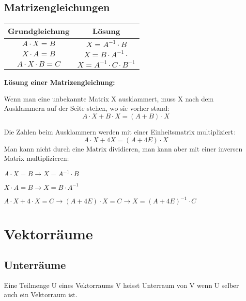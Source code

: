 \begin{multicols*}{3}
    \subsection{Matrizengleichungen}
    { \begin{center}
            \begin{tabular}{ |c|c| }
                \hline
                Grundgleichung        & Lösung                           \\ \hline
                $A \cdot X=B$         & $X = A^{-1}\cdot B$              \\
                $X \cdot A=B$         & $X = B \cdot A^{-1}\cdot $       \\
                $A \cdot X \cdot B=C$ & $X = A^{-1}\cdot C \cdot B^{-1}$ \\
                \hline
            \end{tabular}
        \end{center}}
    {\textbf{Lösung einer Matrizengleichung:} }

    { Wenn man eine unbekannte Matrix X ausklammert, muss X nach
        dem Ausklammern auf der Seite stehen, wo sie vorher stand:}
    $$A \cdot X + B \cdot X =(A + B) \cdot X$$

    {  Die Zahlen beim Ausklammern werden mit einer Einheitsmatrix
            multipliziert:}
    $$A \cdot X + 4 X =( A + 4 E) \cdot X$$
    { Man kann nicht durch eine Matrix dividieren, man kann aber mit
            einer inversen Matrix multiplizieren:}

        { $A\cdot X = B \to X = A^{-1} \cdot B$}

        { $X\cdot A = B \to X = B \cdot A^{-1}$}

        { $A\cdot X + 4 \cdot X = C \to (A+4E) \cdot X = C \to X = (A+4E)^{-1} \cdot C$}






    \vfill\null
    \columnbreak
    \section{Vektorräume}

    \subsection{Unterräume}
    {Eine Teilmenge U eines Vektorraums V heisst Unterraum von V wenn U selber auch ein Vektorraum ist.}


\end{multicols*}
